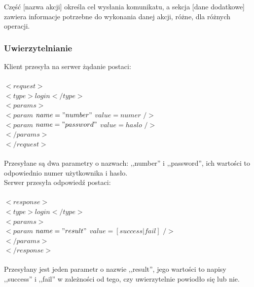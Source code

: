 \documentclass[a4paper,12pt]{article}
\begin{document}
\noindent Część [nazwa akcji] określa cel wysłania komunikatu, a sekcja [dane dodatkowe] zawiera
informacje potrzebne do wykonania danej akcji, różne, dla różnych operacji.

\subsubsection[Uwierzytelnianie]{Uwierzytelnianie}
Klient przesyła na serwer żądanie postaci:\\\\
\noindent  $<request>$\\
\indent    $<type>login</type>$\\
\indent    $<params>$\\
\indent \indent $<param$ $name="number"$ $value=numer$ $/>$\\
\indent \indent $<param$ $name="password"$ $value=haslo$ $/>$\\
\indent    $</params>$\\
$</request>$\\\\

\noindent Przesyłane są dwa parametry o nazwach: ,,number'' i ,,password'', ich wartości to odpowiednio numer użytkownika i hasło.\\
Serwer przesyła odpowiedź postaci:\\\\
\noindent  $<response>$\\
\indent    $<type>login</type>$\\
\indent    $<params>$\\
\indent \indent $<param$ $name="result"$ $value=[success|fail]$ $/>$\\
\indent    $</params>$\\
$</response>$\\\\
\noindent Przesyłany jest jeden parametr o nazwie ,,result'', jego wartości to napisy ,,success'' i ,,fail'' w zależności od tego, czy uwierzytelnie powiodło się lub nie.
\end{document}
